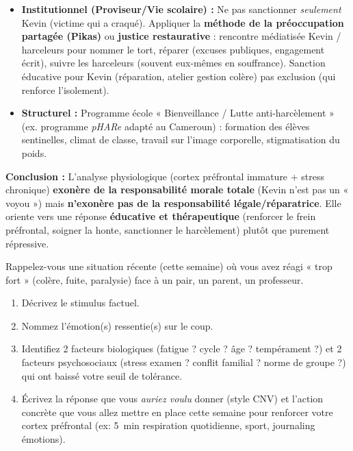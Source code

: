 \documentclass[11pt]{article}
\begin{document}
\begin{exoresolu}
\begin{enumerate}
\begin{itemize}
        \item \textbf{Institutionnel (Proviseur/Vie scolaire) :} Ne pas sanctionner \emph{seulement} Kevin (victime qui a craqué). Appliquer la \textbf{méthode de la préoccupation partagée (Pikas)} ou \textbf{justice restaurative} : rencontre médiatisée Kevin / harceleurs pour nommer le tort, réparer (excuses publiques, engagement écrit), suivre les harceleurs (souvent eux-mêmes en souffrance). Sanction éducative pour Kevin (réparation, atelier gestion colère) pas exclusion (qui renforce l'isolement).
        \item \textbf{Structurel :} Programme école « Bienveillance / Lutte anti-harcèlement » (ex. programme \emph{pHARe} adapté au Cameroun) : formation des élèves sentinelles, climat de classe, travail sur l'image corporelle, stigmatisation du poids.
      \end{itemize}
\end{enumerate}
\textbf{Conclusion :} L'analyse physiologique (cortex préfrontal immature + stress chronique) \textbf{exonère de la responsabilité morale totale} (Kevin n'est pas un « voyou ») mais \textbf{n'exonère pas de la responsabilité légale/réparatrice}. Elle oriente vers une réponse \textbf{éducative et thérapeutique} (renforcer le frein préfrontal, soigner la honte, sanctionner le harcèlement) plutôt que purement répressive.
\end{exoresolu}

\begin{exercice}
Rappelez-vous une situation récente (cette semaine) où vous avez réagi « trop fort » (colère, fuite, paralysie) face à un pair, un parent, un professeur.
\begin{enumerate}
  \item Décrivez le stimulus factuel.
  \item Nommez l'émotion(s) ressentie(s) sur le coup.
  \item Identifiez 2 facteurs biologiques (fatigue ? cycle ? âge ? tempérament ?) et 2 facteurs psychosociaux (stress examen ? conflit familial ? norme de groupe ?) qui ont baissé votre seuil de tolérance.
  \item Écrivez la réponse que vous \emph{auriez voulu} donner (style CNV) et l'action concrète que vous allez mettre en place cette semaine pour renforcer votre cortex préfrontal (ex: \SI{5}{min} respiration quotidienne, sport, journaling émotions).
\end{enumerate}
\end{exercice}
\end{document}
